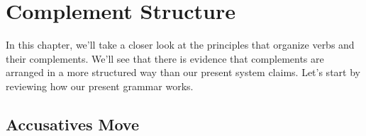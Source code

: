 \chapter{Complement Structure}
\label{ch:compstructure}
\setcounter{exx}{0}

\noindent
In this chapter, we'll take a closer look at the principles that organize verbs and their complements. We'll see that there is evidence that complements are arranged in a more structured way than our present system claims. Let's start by reviewing how our present grammar works.

\section{Accusatives Move} 
\label{sec:accmove}


